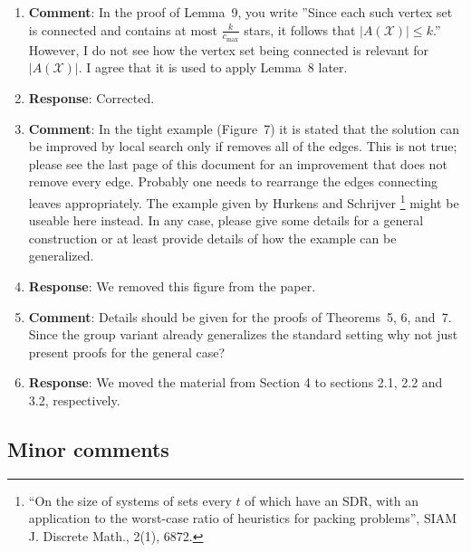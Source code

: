 \documentclass[11pt]{article}
\begin{document}
\begin{enumerate}
\item \textbf{Comment}: In the proof of Lemma~9, you write ”Since each
  such vertex set is connected and contains at most
  $\frac{k}{c_{\max}}$ stars, it follows that $|A(\mathcal{X})| \leq
  k$.''  However, I do not see how the vertex set being connected is
  relevant for $|A(\mathcal{X})|$. I agree that it is used to apply
  Lemma~8 later.

\item[] \textbf{Response}: Corrected.

\item \textbf{Comment}: In the tight example (Figure~7) it is stated
  that the solution can be improved by local search only if removes
  all of the edges.  This is not true; please see the last page of
  this document for an improvement that does not remove every edge.
  Probably one needs to rearrange the edges connecting leaves
  appropriately.  The example given by Hurkens and Schrijver%
%
  \footnote{``On the size of systems of sets every $t$ of which have an
    SDR, with an application to the worst-case ratio of heuristics for
    packing problems'', SIAM J. Discrete Math., 2(1), 6872.}
%
  might be useable here instead.  In any case, please give some
  details for a general construction or at least provide details of
  how the example can be generalized.

\item[] \textbf{Response}: We removed this figure from the paper.
  
\item \textbf{Comment}: Details should be given for the proofs of
  Theorems~5, 6, and~7.  Since the group variant already generalizes
  the standard setting why not just present proofs for the general
  case?

\item[] \textbf{Response}: We moved the material from Section 4 to
  sections 2.1, 2.2 and 3.2, respectively.

\end{enumerate}


\subsection*{Minor comments}
\end{document}
